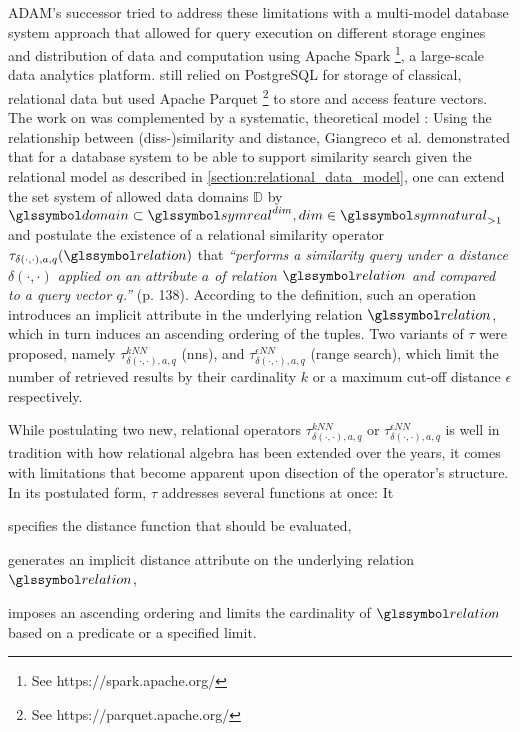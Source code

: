 ADAM's successor \adampro{} \cite{Giangreco:2016Adam} tried to address these limitations with a multi-model database system approach that allowed for query execution on different storage engines and distribution of data and computation using Apache Spark \footnote{See https://spark.apache.org/}, a large-scale data analytics platform. \adampro{} still relied on PostgreSQL for storage of classical, relational data but used Apache Parquet \footnote{See https://parquet.apache.org/} to store and access feature vectors. The work on \adampro was complemented by a systematic, theoretical model \cite{Giangreco:2018Database}: Using the relationship between (diss-)similarity and distance, Giangreco et al. demonstrated that for a database system to be able to support similarity search given the relational model as described in \cref{section:relational_data_model}, one can extend the set system of allowed data domains $\mathbb{D}$ by $\domain \subset \symreal^{dim}, dim \in \symnatural_{>1}$ and postulate the existence of a relational similarity operator $\tau_{\delta(\cdot,\cdot),a,q}(\relation)$ that \emph{``performs a similarity query under a distance $\delta(\cdot,\cdot)$ applied on an attribute $a$ of relation $\relation$ and compared to a query vector $q$.''} \cite{Giangreco:2018Database} (p. 138). According to the definition, such an operation introduces an implicit attribute in the underlying relation $\relation$, which in turn induces an ascending ordering of the tuples. Two variants of $\tau$ were proposed, namely $\tau^{kNN}_{\delta(\cdot,\cdot),a,q}$ (\acrshort{nns}), and $\tau^{\epsilon NN}_{\delta(\cdot,\cdot),a,q}$ (range search), which limit the number of retrieved results by their cardinality $k$ or a maximum cut-off distance $\epsilon$ respectively.

While postulating two new, relational operators $\tau^{kNN}_{\delta(\cdot,\cdot),a,q}$ or $\tau^{\epsilon NN}_{\delta(\cdot,\cdot),a,q}$ is well in tradition with how relational algebra has been extended over the years, it comes with limitations that become apparent upon disection of the operator's structure. In its postulated form, $\tau$ addresses several functions at once: It
\begin{enumerate*}[label=(\roman*)]
    \item specifies the distance function that should be evaluated,
    \item generates an implicit distance attribute on the underlying relation $\relation$,
    \item imposes an ascending ordering and limits the cardinality of $\relation$ based on a predicate or a specified limit.
\end{enumerate*}

